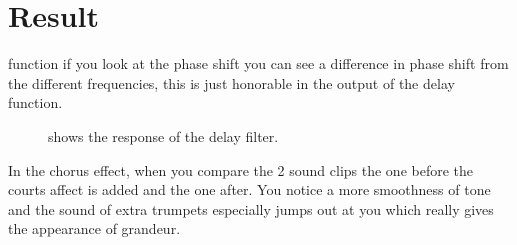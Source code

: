
\section{Result}
function if you look at the phase shift you can see a difference in phase shift from the different frequencies,
this is just honorable in the output of the delay function.


\begin{figure}[!hbt]
	\centering
	\caption{shows the response of the delay filter.}
	\label{fig:response}
\end{figure}


In the chorus effect, when you compare the 2 sound clips the one before the courts affect is added and the one after.
You notice a more smoothness of tone and the sound of extra trumpets especially jumps out at you which really gives the appearance of grandeur.
